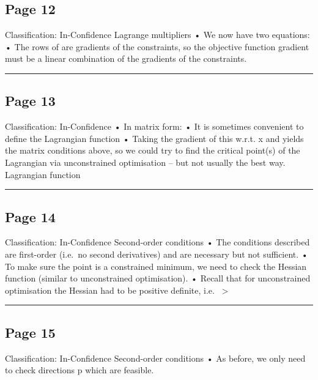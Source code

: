 \documentclass[
]{article}
\begin{document}
\subsection{Page 12}\label{page-12}

Classification: In-Confidence Lagrange multipliers • We now have two
equations: • The rows of are gradients of the constraints, so the
objective function gradient must be a linear combination of the
gradients of the constraints.

\begin{center}\rule{0.5\linewidth}{0.5pt}\end{center}

\subsection{Page 13}\label{page-13}

Classification: In-Confidence • In matrix form: • It is sometimes
convenient to define the Lagrangian function • Taking the gradient of
this w.r.t. x and yields the matrix conditions above, so we could try to
find the critical point(s) of the Lagrangian via unconstrained
optimisation -- but not usually the best way. Lagrangian function

\begin{center}\rule{0.5\linewidth}{0.5pt}\end{center}

\subsection{Page 14}\label{page-14}

Classification: In-Confidence Second-order conditions • The conditions
described are first-order (i.e.~no second derivatives) and are necessary
but not sufficient. • To make sure the point is a constrained minimum,
we need to check the Hessian function (similar to unconstrained
optimisation). • Recall that for unconstrained optimisation the Hessian
had to be positive definite, i.e.~ \textgreater{}

\begin{center}\rule{0.5\linewidth}{0.5pt}\end{center}

\subsection{Page 15}\label{page-15}

Classification: In-Confidence Second-order conditions • As before, we
only need to check directions p which are feasible.
\end{document}

